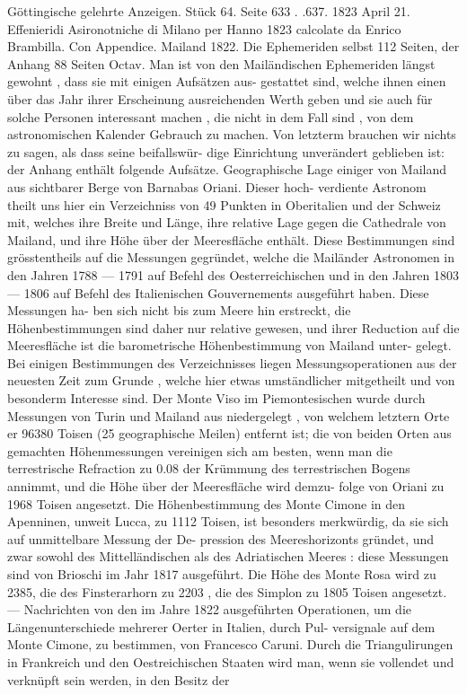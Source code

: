 \documentclass[12pt,a4paper]{article}
\begin{document}
{{{{{{{{Göttingische  gelehrte  Anzeigen.     Stück  64.     Seite  633  .  .637.    1823  April  21. Effenieridi  Asironotniche  di  Milano  per  Hanno  1823  calcolate  da  Enrico  Brambilla.  Con  Appendice. Mailand  1822.    Die  Ephemeriden  selbst  112  Seiten,  der  Anhang  88  Seiten  Octav. Man  ist  von  den  Mailändischen  Ephemeriden  längst  gewohnt ,  dass  sie  mit  einigen  Aufsätzen  aus- gestattet sind,  welche  ihnen  einen  über  das  Jahr  ihrer  Erscheinung  ausreichenden  Werth  geben  und sie  auch  für  solche  Personen  interessant  machen ,  die  nicht  in  dem  Fall  sind ,  von  dem  astronomischen Kalender  Gebrauch  zu  machen.  Von  letzterm  brauchen  wir  nichts  zu  sagen,  als  dass  seine  beifallswür- dige Einrichtung  unverändert  geblieben  ist:  der  Anhang  enthält  folgende  Aufsätze. Geographische  Lage  einiger  von  Mailand  aus  sichtbarer  Berge  von  Barnabas  Oriani.  Dieser  hoch- verdiente Astronom  theilt  uns  hier  ein  Verzeichniss  von  49  Punkten  in  Oberitalien  und  der  Schweiz  mit, welches  ihre  Breite  und  Länge,  ihre  relative  Lage  gegen  die  Cathedrale  von  Mailand,  und  ihre  Höhe über  der  Meeresfläche  enthält.  Diese  Bestimmungen  sind  grösstentheils  auf  die  Messungen  gegründet, welche  die  Mailänder  Astronomen  in  den  Jahren  1788 --- 1791  auf  Befehl  des  Oesterreichischen  und  in  den Jahren  1803 --- 1806  auf  Befehl  des  Italienischen  Gouvernements  ausgeführt  haben.  Diese  Messungen  ha- ben sich  nicht  bis  zum  Meere  hin  erstreckt,  die  Höhenbestimmungen  sind  daher  nur  relative  gewesen, und  ihrer  Reduction  auf  die  Meeresfläche  ist  die  barometrische  Höhenbestimmung  von  Mailand  unter- gelegt. Bei  einigen  Bestimmungen  des  Verzeichnisses  liegen  Messungsoperationen  aus  der  neuesten  Zeit zum  Grunde ,  welche  hier  etwas  umständlicher  mitgetheilt  und  von  besonderm  Interesse  sind.  Der Monte  Viso  im  Piemontesischen  wurde  durch  Messungen  von  Turin  und  Mailand  aus  niedergelegt ,  von welchem  letztern  Orte  er  96380  Toisen  (25  geographische  Meilen)  entfernt  ist;  die  von  beiden  Orten  aus gemachten  Höhenmessungen  vereinigen  sich  am  besten,  wenn  man  die  terrestrische  Refraction  zu  0.08 der  Krümmung  des  terrestrischen  Bogens  annimmt,  und  die  Höhe  über  der  Meeresfläche  wird  demzu- folge von  Oriani  zu  1968  Toisen  angesetzt.  Die  Höhenbestimmung  des  Monte  Cimone  in  den  Apenninen, unweit  Lucca,  zu  1112  Toisen,  ist  besonders  merkwürdig,  da  sie  sich  auf  unmittelbare  Messung  der  De- pression des  Meereshorizonts  gründet,  und  zwar  sowohl  des  Mittelländischen  als  des  Adriatischen  Meeres : diese  Messungen  sind  von  Brioschi  im  Jahr  1817  ausgeführt.  Die  Höhe  des  Monte  Rosa  wird  zu  2385, die  des  Finsterarhorn  zu  2203 ,  die  des  Simplon  zu  1805  Toisen  angesetzt.  ---  Nachrichten  von  den  im Jahre  1822  ausgeführten  Operationen,  um  die  Längenunterschiede  mehrerer  Oerter  in  Italien,  durch  Pul- versignale auf  dem  Monte  Cimone,  zu  bestimmen,  von  Francesco  Caruni.  Durch  die  Triangulirungen  in Frankreich  und  den  Oestreichischen  Staaten  wird  man,  wenn  sie  vollendet  und  verknüpft  sein  werden, in  den  Besitz  der  }}}}}}}}
\end{document}
